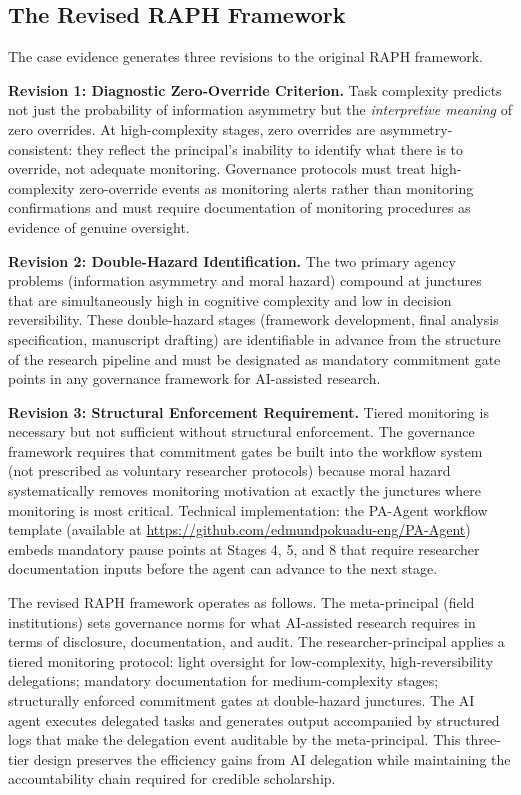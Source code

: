 \documentclass[12pt]{article}
\begin{document}
\subsection{The Revised RAPH Framework}

The case evidence generates three revisions to the original RAPH framework.

\textbf{Revision 1: Diagnostic Zero-Override Criterion.}
Task complexity predicts not just the probability of information asymmetry but the
\emph{interpretive meaning} of zero overrides. At high-complexity stages, zero overrides
are asymmetry-consistent: they reflect the principal's inability to identify what there
is to override, not adequate monitoring. Governance protocols must treat high-complexity
zero-override events as monitoring alerts rather than monitoring confirmations and must
require documentation of monitoring procedures as evidence of genuine oversight.

\textbf{Revision 2: Double-Hazard Identification.}
The two primary agency problems (information asymmetry and moral hazard) compound at
junctures that are simultaneously high in cognitive complexity and low in decision
reversibility. These double-hazard stages (framework development, final analysis
specification, manuscript drafting) are identifiable in advance from the structure of the
research pipeline and must be designated as mandatory commitment gate points in any
governance framework for AI-assisted research.

\textbf{Revision 3: Structural Enforcement Requirement.}
Tiered monitoring is necessary but not sufficient without structural enforcement. The
governance framework requires that commitment gates be built into the workflow
system (not prescribed as voluntary researcher protocols) because moral hazard
systematically removes monitoring motivation at exactly the junctures where monitoring
is most critical. Technical implementation: the PA-Agent workflow template
(available at \url{https://github.com/edmundpokuadu-eng/PA-Agent}) embeds mandatory pause points
at Stages 4, 5, and 8 that require researcher documentation inputs before the agent
can advance to the next stage.

The revised RAPH framework operates as follows. The meta-principal (field institutions)
sets governance norms for what AI-assisted research requires in terms of disclosure,
documentation, and audit. The researcher-principal applies a tiered monitoring
protocol: light oversight for low-complexity, high-reversibility delegations; mandatory
documentation for medium-complexity stages; structurally enforced commitment gates at
double-hazard junctures. The AI agent executes delegated tasks and generates output
accompanied by structured logs that make the delegation event auditable by the
meta-principal. This three-tier design preserves the efficiency gains from AI delegation
while maintaining the accountability chain required for credible scholarship.
\end{document}
